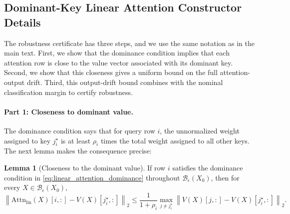 \documentclass{article}
\theoremstyle{definition}
\newtheorem{lemma}[theorem]{Lemma}
\begin{document}
\subsection{Dominant-Key Linear Attention Constructor Details}
\label{app:linear_dominance_attention}

The robustness certificate has three steps, and we use the same notation as in the main text. First, we show that the dominance condition implies that each attention row is close to the value vector associated with its dominant key. Second, we show that this closeness gives a uniform bound on the full attention-output drift. Third, this output-drift bound combines with the nominal classification margin to certify robustness.

\paragraph{Part 1: Closeness to dominant value.}
The dominance condition says that for query row $i$, the unnormalized weight assigned to key $j_i^\star$ is at least $\rho_i$ times the total weight assigned to all other keys. The next lemma makes the consequence precise:

\begin{lemma}[Closeness to the dominant value]
\label{lem:linear_dominant_closeness}
If row $i$ satisfies the dominance condition in \eqref{eq:linear_attention_dominance} throughout $\mathcal B_\epsilon(X_0)$, then for every $X\in\mathcal B_\epsilon(X_0)$,
\begin{equation}
    \left\|
    \mathrm{Attn}_{\mathrm{lin}}(X)[i,:]
    -
    V(X)[j_i^\star,:]
    \right\|_2
    \leq
    \frac{1}{1+\rho_i}
    \max_{j\neq j_i^\star}
    \left\|
    V(X)[j,:]-V(X)[j_i^\star,:]
    \right\|_2.
    \label{eq:app_linear_closeness}
\end{equation}
\end{lemma}
\end{document}
